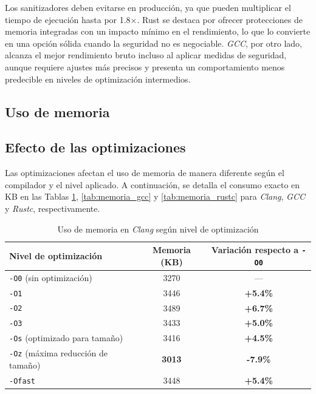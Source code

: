 Los sanitizadores deben evitarse en producción, ya que pueden multiplicar el tiempo de ejecución hasta por 1.8×. 
Rust se destaca por ofrecer protecciones de memoria integradas con un impacto mínimo en el rendimiento, 
lo que lo convierte en una opción sólida cuando la seguridad no es negociable. \emph{GCC}, por otro lado, alcanza 
el mejor rendimiento bruto incluso al aplicar medidas de seguridad, aunque requiere ajustes más precisos y presenta 
un comportamiento menos predecible en niveles de optimización intermedios.

\subsection{Uso de memoria}

\subsection*{Efecto de las optimizaciones}

Las optimizaciones afectan el uso de memoria de manera diferente según el compilador y el nivel aplicado. A continuación, se detalla el consumo exacto en KB en las Tablas \ref{tab:memoria_clang}, \ref{tab:memoria_gcc} y \ref{tab:memoria_rustc} para \emph{Clang}, \emph{GCC} y \emph{Rustc}, respectivamente.

\begin{table}[H]
\centering
\footnotesize
\begin{tabular}{|l|c|c|}
\hline
\textbf{Nivel de optimización} & \textbf{Memoria (KB)} & \textbf{Variación respecto a \texttt{-O0}} \\
\hline
\texttt{-O0} (sin optimización) & 3270 & — \\
\texttt{-O1} & 3446 & \textbf{+5.4\%} \\
\texttt{-O2} & 3489 & \textbf{+6.7\%} \\
\texttt{-O3} & 3433 & \textbf{+5.0\%} \\
\texttt{-Os} (optimizado para tamaño) & 3416 & \textbf{+4.5\%} \\
\texttt{-Oz} (máxima reducción de tamaño) & \textbf{3013} & \textbf{-7.9\%}\\
\texttt{-Ofast} & 3448 & \textbf{+5.4\%} \\
\hline
\end{tabular}
\caption{Uso de memoria en \emph{Clang} según nivel de optimización}
\label{tab:memoria_clang}
\end{table}


